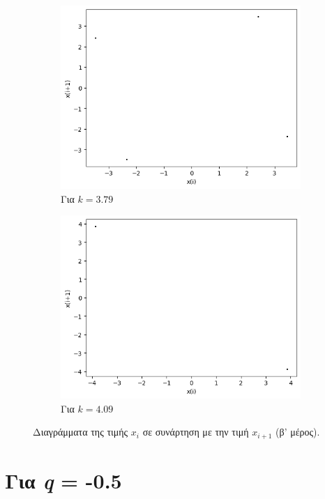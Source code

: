 \begin{figure}[ht]
\begin{subfigure}[b]{0.4\textwidth}
		\includegraphics[width=\textwidth]{LateX images/sine q=-0.3/g12}
		\caption{Για $k=3.79$}
		\label{f:k125}
	\end{subfigure}
	\hfill
	\begin{subfigure}[b]{0.4\textwidth}
		\centering
		\includegraphics[width=\textwidth]{LateX images/sine q=-0.3/g13}
		\caption{Για $k=4.09$}
		\label{f:k126}
	\end{subfigure}
	\hfill
	\caption{Διαγράμματα της τιμής \(x_i\) σε συνάρτηση με την τιμή \(x_{i+1}\) (β' μέρος).}
	\label{f:k247}
\end{figure}

\clearpage 
\section{Για \emph{q} = -0.5}

